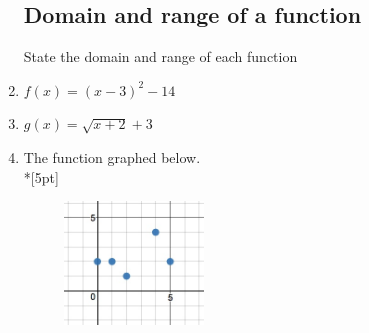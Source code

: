\documentclass[]{book}
\begin{document}
\begin{enumerate}
\subsection*{Domain and range of a function}
State the domain and range of each function 
\item $f(x)=(x-3)^2-14$
\item $g(x)=\sqrt{x+2}+3$
\item The function graphed below.\\*[5pt]

\begin{figure}[!ht]
    \centering
    \includegraphics[width=0.35\textwidth]{discrete-domain-graph.jpeg}
\end{figure}


\end{enumerate}
\end{document}
